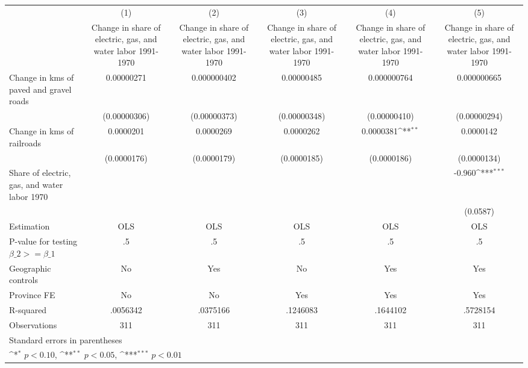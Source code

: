 {
\def\sym#1{\ifmmode^{#1}\else\(^{#1}\)\fi}
\begin{tabular}{l*{5}{c}}
\hline\hline
                    &\multicolumn{1}{c}{(1)}&\multicolumn{1}{c}{(2)}&\multicolumn{1}{c}{(3)}&\multicolumn{1}{c}{(4)}&\multicolumn{1}{c}{(5)}\\
                    &\multicolumn{1}{c}{Change in share of electric, gas, and water labor 1991-1970}&\multicolumn{1}{c}{Change in share of electric, gas, and water labor 1991-1970}&\multicolumn{1}{c}{Change in share of electric, gas, and water labor 1991-1970}&\multicolumn{1}{c}{Change in share of electric, gas, and water labor 1991-1970}&\multicolumn{1}{c}{Change in share of electric, gas, and water labor 1991-1970}\\
\hline
Change in kms of paved and gravel roads&  0.00000271         & 0.000000402         &  0.00000485         & 0.000000764         & 0.000000665         \\
                    &(0.00000306)         &(0.00000373)         &(0.00000348)         &(0.00000410)         &(0.00000294)         \\
[1em]
Change in kms of railroads&   0.0000201         &   0.0000269         &   0.0000262         &   0.0000381\sym{**} &   0.0000142         \\
                    & (0.0000176)         & (0.0000179)         & (0.0000185)         & (0.0000186)         & (0.0000134)         \\
[1em]
Share of electric, gas, and water labor 1970&                     &                     &                     &                     &      -0.960\sym{***}\\
                    &                     &                     &                     &                     &    (0.0587)         \\
\hline
Estimation          &         OLS         &         OLS         &         OLS         &         OLS         &         OLS         \\
P-value for testing $\beta\_2 >= \beta\_1$&          .5         &          .5         &          .5         &          .5         &          .5         \\
Geographic controls &          No         &         Yes         &          No         &         Yes         &         Yes         \\
Province FE         &          No         &          No         &         Yes         &         Yes         &         Yes         \\
R-squared           &    .0056342         &    .0375166         &    .1246083         &    .1644102         &    .5728154         \\
Observations        &         311         &         311         &         311         &         311         &         311         \\
\hline\hline
\multicolumn{6}{l}{\footnotesize Standard errors in parentheses}\\
\multicolumn{6}{l}{\footnotesize \sym{*} \(p<0.10\), \sym{**} \(p<0.05\), \sym{***} \(p<0.01\)}\\
\end{tabular}
}
